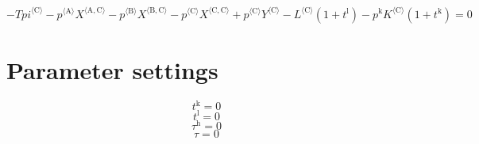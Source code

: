 \begin{equation}
-{{T\!p\!i}}^{\langle \mathrm{C}\rangle} - {{p}^{\langle \mathrm{A}\rangle}} {{X}^{\langle \mathrm{A},\mathrm{C}\rangle}} - {{p}^{\langle \mathrm{B}\rangle}} {{X}^{\langle \mathrm{B},\mathrm{C}\rangle}} - {{p}^{\langle \mathrm{C}\rangle}} {{X}^{\langle \mathrm{C},\mathrm{C}\rangle}} + {{p}^{\langle \mathrm{C}\rangle}} {{Y}^{\langle \mathrm{C}\rangle}} - {{L}^{\langle \mathrm{C}\rangle}} \left(1 + t^{\mathrm{l}}\right) - {p^{\mathrm{k}}} {{K}^{\langle \mathrm{C}\rangle}} \left(1 + t^{\mathrm{k}}\right) = 0
\end{equation}






\section{Parameter settings}

\begin{equation}
t^{\mathrm{k}} = 0
\end{equation}
\begin{equation}
t^{\mathrm{l}} = 0
\end{equation}
\begin{equation}
\tau^{\mathrm{h}} = 0
\end{equation}
\begin{equation}
\tau = 0
\end{equation}


